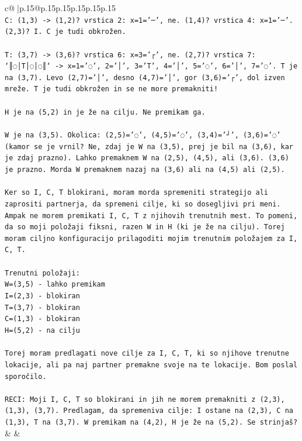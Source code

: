 \documentclass{article}
\begin{document}
{\begin{supertabular}{c@{$\;$}|p{.15\linewidth}@{}p{.15\linewidth}p{.15\linewidth}p{.15\linewidth}p{.15\linewidth}p{.15\linewidth}}
{{{\\ 
\texttt{C: (1,3) {-}> (1,2)? vrstica 2: x=1='─', ne. (1,4)? vrstica 4: x=1='─'. (2,3)? I. C je tudi obkrožen.} \\
\\ 
\texttt{T: (3,7) {-}> (3,6)? vrstica 6: x=3='┌', ne. (2,7)? vrstica 7: `║◌│T│◌│◌║` {-}> x=1='◌', 2='│', 3='T', 4='│', 5='◌', 6='│', 7='◌'. T je na (3,7). Levo (2,7)='│', desno (4,7)='│', gor (3,6)='┌', dol izven mreže. T je tudi obkrožen in se ne more premakniti!} \\
\\ 
\texttt{H je na (5,2) in je že na cilju. Ne premikam ga.} \\
\\ 
\texttt{W je na (3,5). Okolica: (2,5)='◌', (4,5)='◌', (3,4)='┘', (3,6)='◌' (kamor se je vrnil? Ne, zdaj je W na (3,5), prej je bil na (3,6), kar je zdaj prazno). Lahko premaknem W na (2,5), (4,5), ali (3,6). (3,6) je prazno. Morda W premaknem nazaj na (3,6) ali na (4,5) ali (2,5).} \\
\\ 
\texttt{Ker so I, C, T blokirani, moram morda spremeniti strategijo ali zaprositi partnerja, da spremeni cilje, ki so dosegljivi pri meni. Ampak ne morem premikati I, C, T z njihovih trenutnih mest. To pomeni, da so moji položaji fiksni, razen W in H (ki je že na cilju). Torej moram ciljno konfiguracijo prilagoditi mojim trenutnim položajem za I, C, T.} \\
\\ 
\texttt{Trenutni položaji:} \\
\texttt{W=(3,5) {-} lahko premikam} \\
\texttt{I=(2,3) {-} blokiran} \\
\texttt{T=(3,7) {-} blokiran} \\
\texttt{C=(1,3) {-} blokiran} \\
\texttt{H=(5,2) {-} na cilju} \\
\\ 
\texttt{Torej moram predlagati nove cilje za I, C, T, ki so njihove trenutne lokacije, ali pa naj partner premakne svoje na te lokacije. Bom poslal sporočilo.} \\
\\ 
\texttt{RECI: Moji I, C, T so blokirani in jih ne morem premakniti z (2,3), (1,3), (3,7). Predlagam, da spremeniva cilje: I ostane na (2,3), C na (1,3), T na (3,7). W premikam na (4,2), H je že na (5,2). Se strinjaš?} \\
            }
        }
    }
    & & \\ \\


\end{supertabular}}
\end{document}
